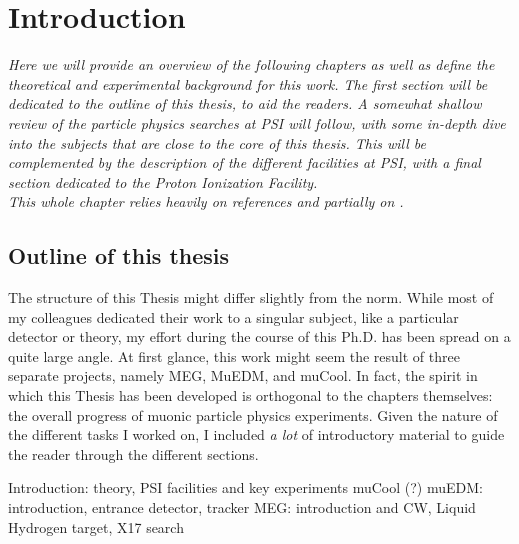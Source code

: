 \chapter{Introduction}

\begin{refsection}

{\itshape
Here we will provide an overview of the following chapters as well as define the theoretical and experimental background for this work. 
The first section will be dedicated to the outline of this thesis, to aid the readers. 
A somewhat shallow review of the particle physics searches at PSI will follow, with some in-depth dive into the subjects that are close to the core of this thesis. 
This will be complemented by the description of the different facilities at PSI, with a final section dedicated to the Proton Ionization Facility.\\ 
This whole chapter relies heavily on references \cite{Signorelli} \cite{PSI:review:2021} and partially on \cite{mythesis}.}

\section{Outline of this thesis}
    The structure of this Thesis might differ slightly from the norm. 
    While most of my colleagues dedicated their work to a singular subject, like a particular detector or theory, my effort during the course of this Ph.D. has been spread on a quite large angle.
    At first glance, this work might seem the result of three separate projects, namely MEG, MuEDM, and muCool. 
    In fact, the spirit in which this Thesis has been developed is orthogonal to the chapters themselves: the overall progress of muonic particle physics experiments.
    Given the nature of the different tasks I worked on, I included \textit{a lot} of introductory material to guide the reader through the different sections.  
    
    \begin{outline}
        \1 Introduction: theory, PSI facilities and key experiments
        \1 muCool (?)
        \1 muEDM: introduction, entrance detector, tracker
        \1 MEG: introduction and CW, Liquid Hydrogen target, X17 search
    \end{outline}


\end{refsection}
